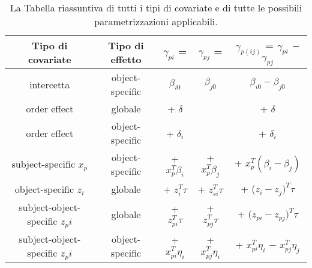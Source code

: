 	\begin{table}[!htb]%
	
	\renewcommand{\arraystretch}{1.7}
	\centering
	\begin{tabular}{c c c c c}
		\hline	
		
		\textbf{Tipo di covariate} & \textbf{Tipo di effetto} & \textbf{$\gamma_{pi}$ =}& \textbf{$\gamma_{pj}$ =} & \textbf{$\gamma_{p(ij)}$ = $\gamma_{pi}$ $-$ $\gamma_{pj}$} \\	
		\hline			
		intercetta & object-specific & $\beta_{i0}$ & $\beta_{j0}$ & $\beta_{i0} - \beta_{j0}$\\
		order effect & globale & + $\delta$ &  & + $\delta$ \\
		order effect & object-specific &  + $\delta_i$ &  &  + $\delta_i$\\
		subject-specific $x_p$ & object-specific & + $x^T_p\beta_i$ & + $x^T_p\beta_j$ & + $x^T_p(\beta_i - \beta_j)$\\
		object-specific $z_i$ & globale & + $z^T_{i}\tau$ & + $z^T_{si}\tau$ & + ($z_{i} - z_{j})^T\tau$\\
		subject-object-specific $z_pi$ & globale & + $z^T_{pi}\tau$ & + $z^T_{pj}\tau$ & + ($z_{pi} - z_{pj})^T\tau$\\
		subject-object-specific $z_pi$ & object-specific & + $x^T_{pi}\eta_i$ & + $x^T_{pj}\eta_i$& + $x^T_{pi}\eta_i$ $-$ $x^T_{pj}\eta_j$\\
		\hline
		
		
	\end{tabular} \hbox{}
	
	\caption{La Tabella riassuntiva di tutti i tipi di covariate e di tutte le possibili parametrizzazioni applicabili.} \label{tab:type}
\end{table}

